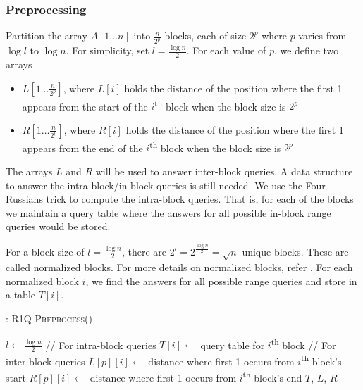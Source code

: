 \documentclass{article}
\begin{document}
\subsubsection{Preprocessing}
Partition the array $A[1 \ldots n]$ into $\frac{n}{2^p}$ blocks, each of size $2^p$ where $p$ varies from $\log l$ to $\log n$. For simplicity, set $l = \frac{\log n}{2}$. For each value of $p$, we define two arrays
\begin{itemize}
\item $L[1 \ldots \frac{n}{2^p}]$, where $L[i]$ holds the distance of the position where the first 1 appears from the start of the $i$\textsuperscript{th} block when the block size is $2^p$
\item $R[1 \ldots \frac{n}{2^p}]$, where $R[i]$ holds the distance of the position where the first 1 appears from the end of the $i$\textsuperscript{th} block when the block size is $2^p$
\end{itemize}

The arrays $L$ and $R$ will be used to answer inter-block queries. A data structure to answer the intra-block/in-block queries is still needed. We use the Four Russians trick to compute the intra-block queries. That is, for each of the blocks we maintain a query table where the answers for all possible in-block range queries would be stored. 

For a block size of $l = \frac{\log n}{2}$, there are $2^l = 2^{\frac{\log n}{2}} = \sqrt n$ unique blocks. These are called normalized blocks. For more details on normalized blocks, refer \cite{bendercolton}. For each normalized block $i$, we find the answers for all possible range queries and store in a table $T[i]$.
 
\begin{algorithm}
\begin{algorithmic}[1]
\caption{: \textsc{R1Q-Preprocess}()}
\label{r1qtlrpreprocess}
\medskip
\STATE $l \gets \frac{\log n}{2}$
\medskip
\STATE // For intra-block queries
	\STATE $T[i] \gets $ query table for $i$\textsuperscript{th} block
\ENDFOR
\medskip
\STATE // For inter-block queries
		\STATE $L[p][i] \gets $ distance where first 1 occurs from $i$\textsuperscript{th} block's start
		\STATE $R[p][i] \gets $ distance where first 1 occurs from $i$\textsuperscript{th} block's end
	\ENDFOR
\ENDFOR
\medskip
\RETURN $T$, $L$, $R$
\medskip
\end{algorithmic}
\end{algorithm}
\end{document}
